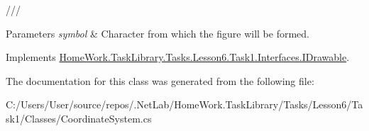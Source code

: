 /// 
\begin{DoxyParams}{Parameters}
{\em symbol} & Character from which the figure will be formed.\\
\hline
\end{DoxyParams}


Implements \mbox{\hyperlink{interface_home_work_1_1_task_library_1_1_tasks_1_1_lesson6_1_1_task1_1_1_interfaces_1_1_i_drawable_aa8cfbe113bc9f372a0695e1d4286071c}{Home\+Work.\+Task\+Library.\+Tasks.\+Lesson6.\+Task1.\+Interfaces.\+I\+Drawable}}.



The documentation for this class was generated from the following file\+:\begin{DoxyCompactItemize}
\item 
C\+:/\+Users/\+User/source/repos/.\+Net\+Lab/\+Home\+Work.\+Task\+Library/\+Tasks/\+Lesson6/\+Task1/\+Classes/Coordinate\+System.\+cs\end{DoxyCompactItemize}
